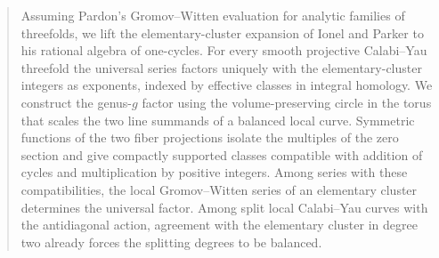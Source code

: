 \begin{abstract}
Assuming Pardon's Gromov--Witten evaluation for analytic families of
threefolds, we lift the elementary-cluster expansion of Ionel and
Parker to his rational algebra of one-cycles. For every smooth
projective Calabi--Yau threefold the universal series factors uniquely
with the elementary-cluster integers as exponents, indexed by effective
classes in integral homology. We construct the genus-$g$ factor using
the volume-preserving circle in the torus that scales the two line
summands of a balanced local curve. Symmetric functions of the two
fiber projections isolate the multiples of the zero section and give
compactly supported classes compatible with addition of cycles and
multiplication by positive integers. Among series with these
compatibilities, the local
Gromov--Witten series of an elementary cluster determines the
universal factor. Among split local Calabi--Yau curves with the
antidiagonal action, agreement with the elementary cluster in
degree two already forces the splitting degrees to be balanced.
\end{abstract}
